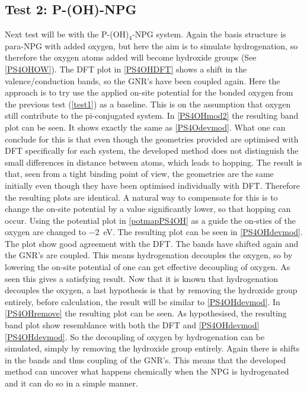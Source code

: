 \subsection{Test 2: P-(OH)-NPG}\label{test2}
Next test will be with the P-(OH)\(_4\)-NPG system. Again the basis structure is para-NPG with added oxygen, but here the aim is to simulate hydrogenation, so therefore the oxygen atoms added will become hydroxide groups (See \cref{PS4OHOW}). The DFT plot in \cref{PS4OHDFT} shows a shift in the valence/conduction bands, so the GNR's have been coupled again. Here the approach is to try use the applied on-site potential for the bonded oxygen from the previous test (\cref{test1}) as a baseline. This is on the assumption that oxygen still contribute to the pi-conjugated system. In \cref{PS4OHmod2} the resulting band plot can be seen. It shows exactly the same as \cref{PS4Odevmod}. What one can conclude for this is that even though the geometries provided are optimised with DFT specifically for each system, the developed method does not distinguish the small differences in distance between atoms, which leads to hopping. The result is that, seen from a tight binding point of view, the geometries are the same initially even though they have been optimised individually with DFT. Therefore the resulting plots are identical. A natural way to compensate for this is to change the on-site potential by a value significantly lower, so that hopping can occur. Using the potential plot in \cref{potmapPS4OH} as a guide the on-sties of the oxygen are changed to \SI{-2}{\electronvolt}. The resulting plot can be seen in \cref{PS4OHdevmod}. The plot show good agreement with the DFT. The bands have shifted again and the GNR's are coupled. This means hydrogenation decouples the oxygen, so by lowering the on-site potential of one can get effective decoupling of oxygen. As seen this gives a satisfying result. Now that it is known that hydrogenation decouples the oxygen, a last hypothesis is that by removing the hydroxide group entirely, before calculation, the result will be similar to \cref{PS4OHdevmod}. In \cref{PS4OHremove} the resulting plot can be seen. As hypothesised, the resulting band plot show resemblance with both the DFT and \cref{PS4OHdevmod} \cref{PS4OHdevmod}. So the decoupling of oxygen by hydrogenation can be simulated, simply by removing the hydroxide group entirely. Again there is shifts in the bands and thus coupling of the GNR's. This means that the developed method can uncover what happens chemically when the NPG is hydrogenated and it can do so in a simple manner. 

